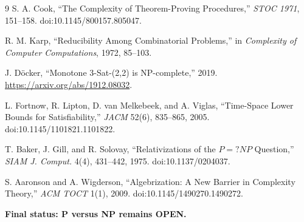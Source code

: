 \documentclass[11pt]{article}
\begin{document}
\begin{thebibliography}{9}
S. A. Cook, ``The Complexity of Theorem-Proving Procedures,''
\emph{STOC 1971}, 151--158. doi:10.1145/800157.805047.

R. M. Karp, ``Reducibility Among Combinatorial Problems,'' in
\emph{Complexity of Computer Computations}, 1972, 85--103.

J. D\"ocker, ``Monotone 3-Sat-(2,2) is NP-complete,'' 2019.
\url{https://arxiv.org/abs/1912.08032}.

L. Fortnow, R. Lipton, D. van Melkebeek, and A. Viglas,
``Time-Space Lower Bounds for Satisfiability,'' \emph{JACM} 52(6),
835--865, 2005. doi:10.1145/1101821.1101822.

T. Baker, J. Gill, and R. Solovay, ``Relativizations of the \(P=?NP\)
Question,'' \emph{SIAM J. Comput.} 4(4), 431--442, 1975.
doi:10.1137/0204037.

S. Aaronson and A. Wigderson, ``Algebrization: A New Barrier in Complexity
Theory,'' \emph{ACM TOCT} 1(1), 2009. doi:10.1145/1490270.1490272.
\end{thebibliography}

\bigskip
\noindent\textbf{Final status: P versus NP remains OPEN.}

\end{document}
